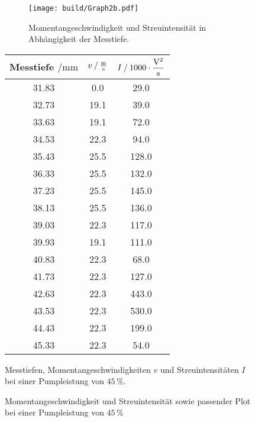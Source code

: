 \begin{figure}[H]
    \begin{subfigure}{0.57\textwidth} 
        \centering
        \texttt{[image: build/Graph2b.pdf]} 
        \caption{Momentangeschwindigkeit und Streuintensität in Abhängigkeit der Messtiefe.}
        \label{fig:graph2b}
        \qquad
    \end{subfigure}
    \begin{subtable}{0.43\textwidth}
        \centering
       \begin{tabular}{c c c}
        \toprule 
        {Messtiefe $\mathbin{/} \unit{\milli\meter}$} & {$v \mathbin{/} \unit{\frac{\meter}{\second}} $} & {$I \mathbin{/} 1000 \cdot \unit{\dfrac{\volt^2}{\second}}$}  \\
        \midrule 
            31.83      &  0.0      &29.0    \\
            32.73      &  19.1     &39.0    \\
            33.63      &  19.1     &72.0    \\
            34.53      &  22.3     &94.0    \\
            35.43      &  25.5     &128.0   \\
            36.33      &  25.5     &132.0   \\
            37.23      &  25.5     &145.0   \\
            38.13      &  25.5     &136.0   \\
            39.03      &  22.3     &117.0   \\
            39.93      &  19.1     &111.0   \\
            40.83      &  22.3     &68.0    \\
            41.73      &  22.3     &127.0   \\
            42.63     &  22.3     &443.0   \\
            43.53     &  22.3     &530.0   \\
            44.43     &  22.3     &199.0   \\
            45.33     &  22.3     &54.0    \\
        \bottomrule
    \end{tabular} 
    \caption{Messtiefen, Momentangeschwindigkeiten $v$ und Streuintensitäten $I$ bei einer Pumpleistung von $45 \,\%$.}
     \label{tab:2b}  
 \end{subtable}
 \caption{Momentangeschwindigkeit und Streuintensität sowie passender Plot bei einer Pumpleistung von $45 \,\%$} 
\end{figure}     



